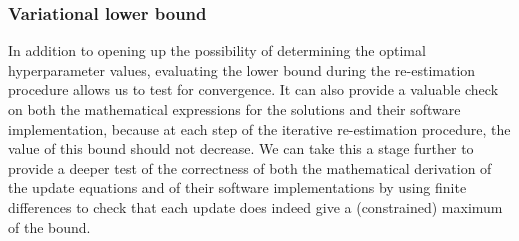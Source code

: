 \subsubsection{Variational lower bound}

In addition to opening up the possibility of determining the optimal hyperparameter values, evaluating the lower bound during the re-estimation procedure allows us to test for convergence. It can also provide a valuable check on both the mathematical expressions for the solutions and their software implementation, because at each step of the iterative re-estimation procedure, the value of this bound should not decrease.
We can take this a stage further to provide a deeper test of the correctness of both the mathematical derivation of the update equations and of their software implementations by using finite differences to check that each update does indeed give a (constrained) maximum of the bound.

